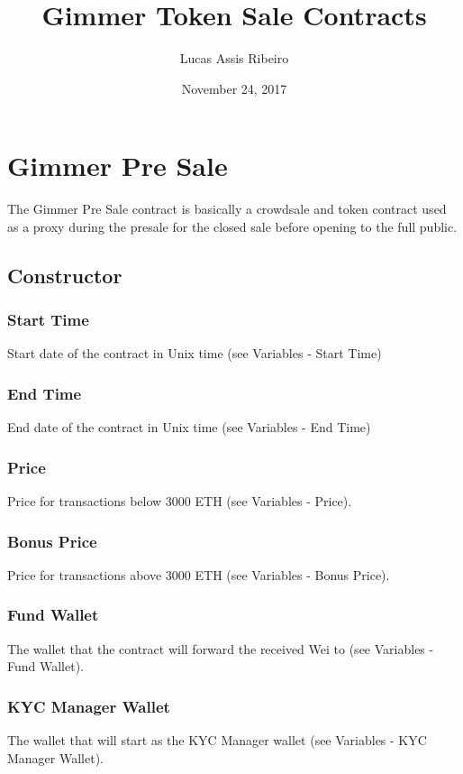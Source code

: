 \documentclass[11pt]{article} %
\title{Gimmer Token Sale Contracts}
\author{Lucas Assis Ribeiro}
\date{November 24, 2017} %
\begin{document}
\maketitle

\section {Gimmer Pre Sale}

The Gimmer Pre Sale contract is basically a crowdsale and token contract used as a proxy during the presale for the closed sale before opening to the full public.\\

\subsection{Constructor}
\subsubsection{Start Time}
Start date of the contract in Unix time (see Variables - Start Time)

\subsubsection{End Time}
End date of the contract in Unix time (see Variables - End Time)

\subsubsection{Price}
Price for transactions below 3000 ETH (see Variables - Price).

\subsubsection{Bonus Price}
Price for transactions above 3000 ETH (see Variables - Bonus Price).

\subsubsection{Fund Wallet}
The wallet that the contract will forward the received Wei to (see Variables - Fund Wallet).

\subsubsection{KYC Manager Wallet}
The wallet that will start as the KYC Manager wallet (see Variables - KYC Manager Wallet).
\end{document}
